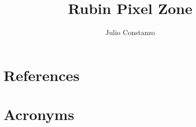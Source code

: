 \documentclass[PMO,authoryear,toc]{lsstdoc}
\title{Rubin Pixel Zone}
\author{%
Julio Constanzo
}
\date{\vcsDate}
\begin{document}
\maketitle


\appendix
\section{References} \label{sec:bib}
\renewcommand{\refname}{} %


\section{Acronyms} \label{sec:acronyms}

\end{document}
